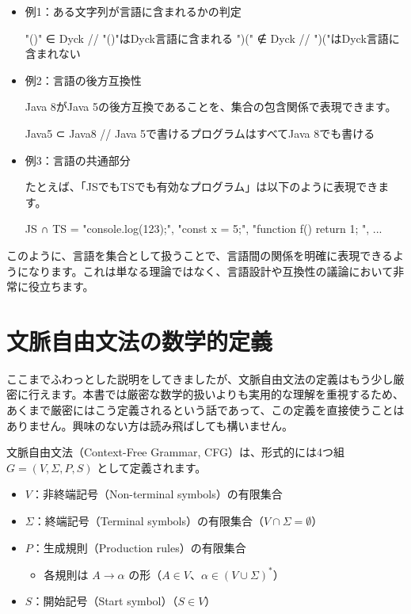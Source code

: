 \begin{itemize}
\item
  例1：ある文字列が言語に含まれるかの判定

\begin{codescreen}{}
"()" ∈ Dyck         // "()"はDyck言語に含まれる
")(" ∉ Dyck         // ")("はDyck言語に含まれない
\end{codescreen}
\item
  例2：言語の後方互換性

Java 8がJava 5の後方互換であることを、集合の包含関係で表現できます。

\begin{codescreen}{}
Java5 ⊂ Java8     // Java 5で書けるプログラムはすべてJava 8でも書ける
\end{codescreen}
\item
  例3：言語の共通部分

たとえば、「JSでもTSでも有効なプログラム」は以下のように表現できます。

\begin{codescreen}{}
JS ∩ TS = {
  "console.log(123);",
  "const x = 5;",
  "function f() { return 1; }",
  ...
}
\end{codescreen}
\end{itemize}

このように、言語を集合として扱うことで、言語間の関係を明確に表現できるようになります。これは単なる理論ではなく、言語設計や互換性の議論において非常に役立ちます。

\section{文脈自由文法の数学的定義}

ここまでふわっとした説明をしてきましたが、文脈自由文法の定義はもう少し厳密に行えます。本書では厳密な数学的扱いよりも実用的な理解を重視するため、あくまで厳密にはこう定義されるという話であって、この定義を直接使うことはありません。興味のない方は読み飛ばしても構いません。

文脈自由文法（Context-Free Grammar, CFG）は、形式的には4つ組
\(G = (V, \Sigma, P, S)\) として定義されます。

\begin{itemize}
\item
  \(V\)：非終端記号（Non-terminal symbols）の有限集合
\item
  \(\Sigma\)：終端記号（Terminal
  symbols）の有限集合（\(V \cap \Sigma = \emptyset\)）
\item
  \(P\)：生成規則（Production rules）の有限集合

  \begin{itemize}
  \item
    各規則は \(A \rightarrow \alpha\)
    の形（\(A \in V\)、\(\alpha \in (V \cup \Sigma)^*\)）
  \end{itemize}
\item
  \(S\)：開始記号（Start symbol）（\(S \in V\)）
\end{itemize}

